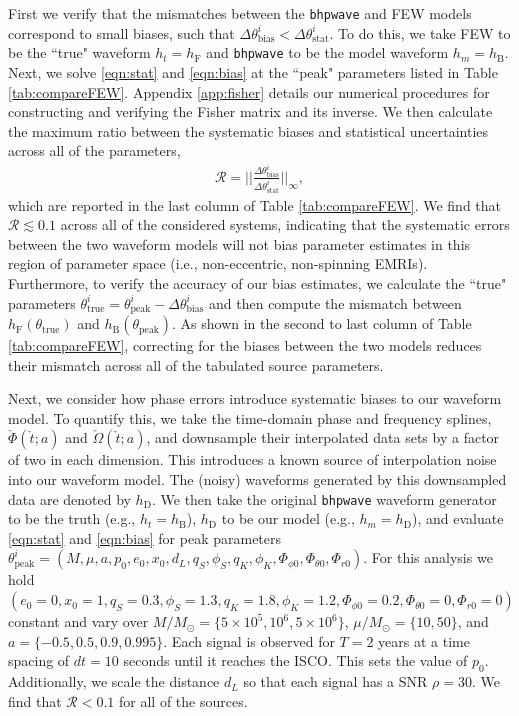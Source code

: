 \documentclass[%
 reprint,
 nofootinbib,
 amsmath,amssymb,
 aps,
 prd,
]{revtex4-2}
\begin{document}
First we verify that the mismatches between the \texttt{bhpwave} and FEW models correspond to small biases, such that $\Delta {\theta}^{i}_\mathrm{bias} < \Delta {\theta}^{i}_\mathrm{stat}$. To do this, we take FEW to be the ``true" waveform $h_t = h_\mathrm{F}$ and \texttt{bhpwave} to be the model waveform $h_m = h_\mathrm{B}$. Next, we solve \eqref{eqn:stat} and \eqref{eqn:bias} at the ``peak" parameters listed in Table \ref{tab:compareFEW}. Appendix \ref{app:fisher} details our numerical procedures for constructing and verifying the Fisher matrix and its inverse. We then calculate the maximum ratio between the systematic biases and statistical uncertainties across all of the parameters,
\begin{align}
    \mathcal{R} = \bigg|\bigg|\frac{\Delta \theta^i_\mathrm{bias}}{\Delta {\theta}^i_\mathrm{stat}}\bigg|\bigg|_\infty,
\end{align}
which are reported in the last column of Table \ref{tab:compareFEW}. We find that $\mathcal{R} \lesssim 0.1$ across all of the considered systems, indicating that the systematic errors between the two waveform models will not bias parameter estimates in this region of parameter space (i.e., non-eccentric, non-spinning EMRIs). Furthermore, to verify the accuracy of our bias estimates, we calculate the ``true" parameters $\theta^i_\mathrm{true} = \theta^i_\mathrm{peak} - \Delta \theta^i_\mathrm{bias}$ and then compute the mismatch between $h_\mathrm{F}(\theta_\mathrm{true})$ and $h_\mathrm{B}(\theta_\mathrm{peak})$. As shown in the second to last column of Table \ref{tab:compareFEW}, correcting for the biases between the two models reduces their mismatch across all of the tabulated source parameters.

Next, we consider how phase errors introduce systematic biases to our waveform model. To quantify this, we take the time-domain phase and frequency splines, $\check{\Phi}(\check{t}; a)$ and $\check{\Omega}(\check{t}; a)$, and downsample their interpolated data sets by a factor of two in each dimension. This introduces a known source of interpolation noise into our waveform model. The (noisy) waveforms generated by this downsampled data are denoted by $h_\mathrm{D}$. We then take the original \texttt{bhpwave} waveform generator to be the truth (e.g., $h_t = h_\mathrm{B}$), $h_\mathrm{D}$ to be our model (e.g., $h_m = h_\mathrm{D}$), and evaluate \eqref{eqn:stat} and \eqref{eqn:bias} for peak parameters $\theta^i_\mathrm{peak} = (M, \mu, a, p_0, e_0, x_0, d_L, q_S, \phi_S, q_K, \phi_K, \Phi_{\phi0}, \Phi_{\theta0}, \Phi_{r0})$. For this analysis we hold $(e_0 = 0, x_0 = 1, q_S = 0.3, \phi_S = 1.3, q_K = 1.8, \phi_K = 1.2, \Phi_{\phi 0} = 0.2, \Phi_{\theta0} = 0, \Phi_{r0} = 0)$ constant and vary over $M/M_\odot = \{5\times 10^{5}, 10^{6}, 5\times 10^{6}\}$, $\mu/M_\odot = \{10, 50\}$, and $a = \{-0.5, 0.5, 0.9, 0.995\}$. Each signal is observed for $T = 2$ years at a time spacing of $dt = 10 $ seconds until it reaches the ISCO. This sets the value of $p_0$. Additionally, we scale the distance $d_L$ so that each signal has a SNR $\rho = 30$. We find that $\mathcal{R} < 0.1$ for all of the sources. 
\end{document}
